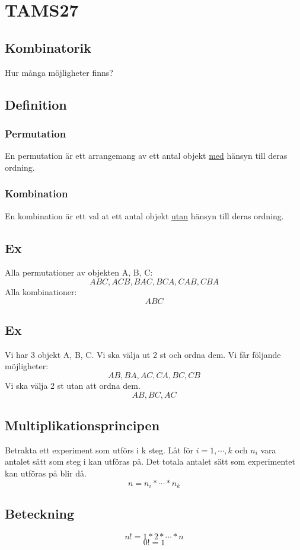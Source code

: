 \documentclass{article}
\begin{document}
\section{TAMS27}
\subsection{Kombinatorik}
Hur många möjligheter finns?
\subsection{Definition}
\subsubsection{Permutation}
En permutation är ett arrangemang av ett antal objekt \underline{med} hänsyn till deras ordning.
\subsubsection{Kombination}
En kombination är ett val at ett antal objekt \underline{utan} hänsyn till deras ordning.

\subsection{Ex}
Alla permutationer av objekten A, B, C:\\
$$ ABC, ACB, BAC, BCA, CAB, CBA $$
Alla kombinationer: 
$$ ABC $$

\subsection{Ex}
Vi har 3 objekt A, B, C. Vi ska välja ut 2 st och ordna dem.
Vi får följande möjligheter:
$$ AB, BA, AC, CA, BC, CB $$
Vi ska välja 2 st utan att ordna dem.
$$ AB, BC, AC $$

\subsection{Multiplikationsprincipen}
Betrakta ett experiment som utförs i k steg. Låt för $ i = 1, \cdots, k $ och $ n_i $ vara antalet sätt som steg i kan utföras på.
Det totala antalet sätt som experimentet kan utföras på blir då.
$$ n = n_i * \cdots * n_k $$

\subsection{Beteckning}
$$ n! = 1*2* \cdots *n $$
$$ 0! = 1 $$
\end{document}
